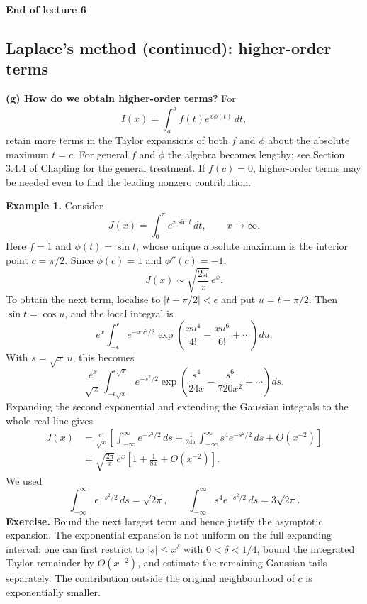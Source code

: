 \documentclass[11pt,a4paper]{article}
\begin{document}
\begin{center}
    \textbf{End of lecture 6}
\end{center}

\subsection*{Laplace's method (continued): higher-order terms}

\noindent\textbf{(g) How do we obtain higher-order terms?}
For
\[
    I(x)=\int_a^b f(t)e^{x\phi(t)}\,dt,
\]
retain more terms in the Taylor expansions of both $f$ and $\phi$ about
the absolute maximum $t=c$. For general $f$ and $\phi$ the algebra becomes
lengthy; see Section 3.4.4 of Chapling for the general treatment.
If $f(c)=0$, higher-order terms may be needed even to find the leading
nonzero contribution.

\medskip
\noindent\textbf{Example 1.}
Consider
\[
    J(x)=\int_0^\pi e^{x\sin t}\,dt,\qquad x\to\infty.
\]
Here $f=1$ and $\phi(t)=\sin t$, whose unique absolute maximum is the
interior point $c=\pi/2$. Since $\phi(c)=1$ and $\phi''(c)=-1$,
\[
    J(x)\sim\sqrt{\frac{2\pi}{x}}\,e^x.
\]
To obtain the next term, localise to $|t-\pi/2|<\epsilon$ and put
$u=t-\pi/2$. Then $\sin t=\cos u$, and the local integral is
\[
    e^x\int_{-\epsilon}^{\epsilon}e^{-xu^2/2}
    \exp\!\left(\frac{xu^4}{4!}-\frac{xu^6}{6!}+\cdots\right)du.
\]
With $s=\sqrt{x}\,u$, this becomes
\[
    \frac{e^x}{\sqrt{x}}
    \int_{-\epsilon\sqrt{x}}^{\epsilon\sqrt{x}}e^{-s^2/2}
    \exp\!\left(\frac{s^4}{24x}-\frac{s^6}{720x^2}+\cdots\right)ds.
\]
Expanding the second exponential and extending the Gaussian integrals
to the whole real line gives
\begin{align*}
    J(x)&=\frac{e^x}{\sqrt{x}}\left[
    \int_{-\infty}^{\infty}e^{-s^2/2}\,ds
    +\frac{1}{24x}\int_{-\infty}^{\infty}s^4e^{-s^2/2}\,ds
    +O(x^{-2})\right]\\
    &=\boxed{\sqrt{\frac{2\pi}{x}}\,e^x
    \left[1+\frac{1}{8x}+O(x^{-2})\right]}.
\end{align*}
We used
\[
    \int_{-\infty}^{\infty}e^{-s^2/2}\,ds=\sqrt{2\pi},
    \qquad
    \int_{-\infty}^{\infty}s^4e^{-s^2/2}\,ds=3\sqrt{2\pi}.
\]
\noindent\textbf{Exercise.}
Bound the next largest term and hence justify the asymptotic expansion.
The exponential expansion is not uniform on the full expanding interval:
one can first restrict to $|s|\leq x^\delta$ with $0<\delta<1/4$,
bound the integrated Taylor remainder by $O(x^{-2})$, and estimate the
remaining Gaussian tails separately. The contribution outside the
original neighbourhood of $c$ is exponentially smaller.
\end{document}
